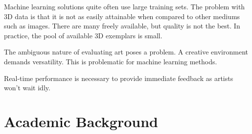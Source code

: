 \documentclass[a4paper, fontsize=15pt, onecolumn]{article} %
\numberwithin{equation}{section} %
\numberwithin{figure}{section} %
\numberwithin{table}{section} %
\begin{document}
Machine learning solutions quite often use large training sets. The problem with 3D data is that it is not as easily attainable when compared to other mediums such as images. There are many freely available, but quality is not the best. In practice, the pool of available 3D exemplars is small.

The ambiguous nature of evaluating art poses a problem. A creative environment demands versatility. This is problematic for machine learning methods.

Real-time performance is necessary to provide immediate feedback as artists won't wait idly.

\section{Academic Background}




\end{document}
